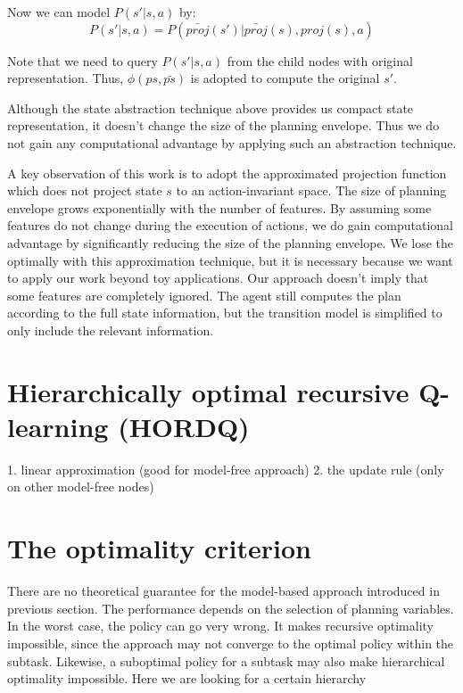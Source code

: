 \documentclass{article} %
\begin{document}
Now we can model $P(s'|s, a)$ by:
\begin{equation}
    P(s'|s, a) = P(\bar{proj}(s')| \bar{proj}(s), proj(s), a)
\end{equation}

Note that we need to query $P(s'|s, a)$ from the child nodes with original representation.
Thus, $\phi(ps, \bar{ps})$ is adopted to compute the original $s'$.  

Although the state abstraction technique above provides us compact state representation, 
it doesn't change the size of the planning envelope. Thus we do not gain any computational
advantage by applying such an abstraction technique.

A key observation of this work is to adopt the approximated projection function which
does not project state $s$ to an action-invariant space.
The size of planning envelope grows exponentially with the number of features.
By assuming 
some features do not change during the execution of actions, we do gain computational advantage by
significantly reducing the size of the planning envelope. 
We lose the optimally with this approximation technique, but it is necessary because we want 
to apply our work beyond toy applications.
Our approach doesn't imply that
some features are completely ignored. The agent still computes the plan according to 
the full state information, but the transition model is simplified to only include the 
relevant information.

\section{Hierarchically optimal recursive Q-learning (HORDQ)}
1. linear approximation (good for model-free approach)
2. the update rule (only on other model-free nodes)

\section{The optimality criterion}

There are no theoretical guarantee for the model-based approach introduced in previous 
section. The performance depends on the selection of planning variables. In the worst
case, the policy can go very wrong. It makes recursive optimality impossible, since
the approach may not converge to the optimal policy within the subtask. Likewise,
a suboptimal policy for a subtask may also make hierarchical optimality impossible.
Here we are looking for a certain hierarchy  
\end{document}
